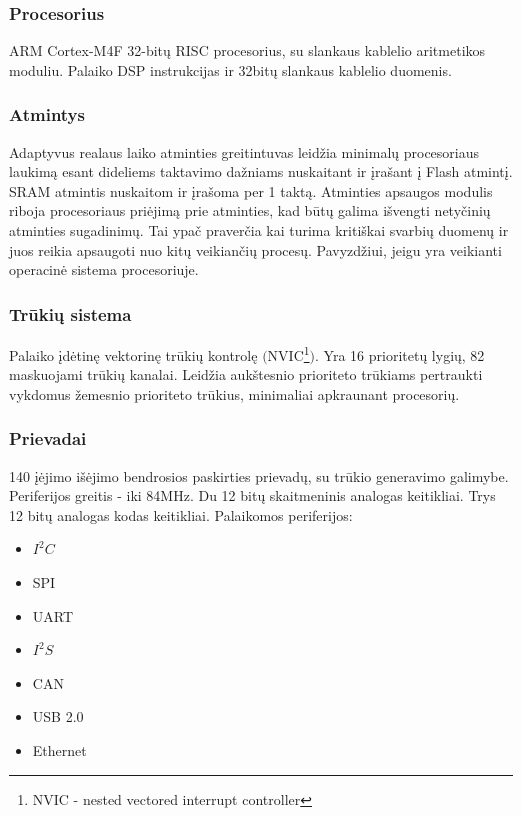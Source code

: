 \documentclass[a4paper, 12pt]{article} %
\begin{document}
\begin{onehalfspacing}
\subsubsection{Procesorius}
ARM Cortex-M4F 32-bit\k{u} RISC procesorius, su slankaus kablelio aritmetikos moduliu. Palaiko DSP instrukcijas ir 32bit\k{u} slankaus kablelio duomenis.      


\subsubsection{Atmintys}
Adaptyvus realaus laiko atminties greitintuvas leid\v{z}ia minimal\k{u} procesoriaus laukim\k{a} esant dideliems taktavimo da\v{z}niams nuskaitant ir \k{i}ra\v{s}ant \k{i} Flash atmint\k{i}. SRAM atmintis nuskaitom ir \k{i}ra\v{s}oma per 1 takt\k{a}. Atminties apsaugos modulis riboja procesoriaus pri\.ejim\k{a} prie atminties, kad b\=ut\k{u} galima i\v{s}vengti nety\v{c}ini\k{u} atminties sugadinim\k{u}. Tai ypa\v{c} praver\v{c}ia kai turima kriti\v{s}kai svarbi\k{u} duomen\k{u} ir juos reikia apsaugoti nuo kit\k{u} veikian\v{c}i\k{u} proces\k{u}. Pavyzd\v{z}iui, jeigu yra veikianti operacin\.e sistema procesoriuje.


\subsubsection{Tr\=uki\k{u} sistema}
Palaiko \k{i}d\.etin\k{e} vektorin\k{e} tr\=uki\k{u} kontrol\k{e} $($NVIC\footnote{NVIC - nested vectored interrupt controller}$)$.
Yra 16 prioritet\k{u} lygi\k{u}, 82 maskuojami tr\=uki\k{u} kanalai. Leid\v{z}ia auk\v{s}tesnio prioriteto tr\=ukiams pertraukti vykdomus \v{z}emesnio prioriteto tr\=ukius, minimaliai apkraunant procesori\k{u}. 


\subsubsection{Prievadai}    
140 \k{i}\.ejimo i\v{s}\.ejimo bendrosios paskirties prievad\k{u}, su tr\=ukio generavimo galimybe. Periferijos greitis - iki 84MHz. Du 12 bit\k{u} skaitmeninis analogas keitikliai. Trys 12 bit\k{u} analogas kodas keitikliai. 
Palaikomos periferijos:
\begin{itemize}
\item $I^2C$
\item SPI
\item UART
\item $I^2S$
\item CAN
\item USB 2.0
\item Ethernet
\end{itemize}


\end{onehalfspacing}
\end{document}
